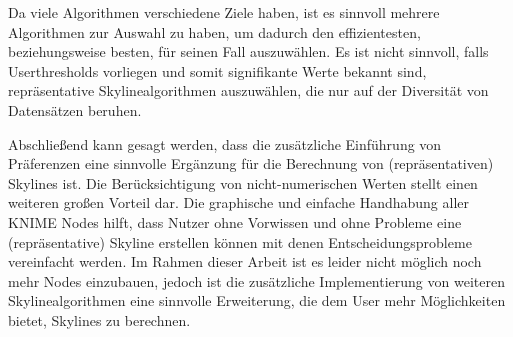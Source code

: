 Da viele Algorithmen verschiedene Ziele haben, ist es sinnvoll mehrere Algorithmen zur Auswahl zu haben, um dadurch den effizientesten, beziehungsweise besten, für seinen Fall auszuwählen. Es ist nicht sinnvoll, falls Userthresholds vorliegen und somit signifikante Werte bekannt sind, repräsentative Skylinealgorithmen auszuwählen, die nur auf der Diversität von Datensätzen beruhen. 

Abschließend kann gesagt werden, dass die zusätzliche Einführung von Präferenzen eine sinnvolle Ergänzung für die Berechnung von (repräsentativen) Skylines ist. Die Berücksichtigung von nicht-numerischen Werten stellt einen weiteren großen Vorteil dar. Die graphische und einfache Handhabung aller KNIME Nodes hilft, dass Nutzer ohne Vorwissen und ohne Probleme eine (repräsentative) Skyline erstellen können mit denen Entscheidungsprobleme vereinfacht werden. Im Rahmen dieser Arbeit ist es leider nicht möglich noch mehr Nodes einzubauen, jedoch ist die zusätzliche Implementierung von weiteren Skylinealgorithmen eine sinnvolle Erweiterung, die dem User mehr Möglichkeiten bietet, Skylines zu berechnen.

